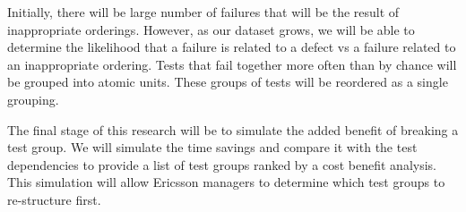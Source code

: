 Initially, there will be large number of failures that will be the result of inappropriate orderings. However, as our dataset grows, we will be able to determine the likelihood that a failure is related to a defect vs a failure related to an inappropriate ordering. Tests that fail together more often than by chance will be grouped into atomic units. These groups of tests will be reordered as a single grouping.

The final stage of this research will be to simulate the added benefit of breaking a test group. We will simulate the time savings and compare it with the test dependencies to provide a list of test groups ranked by a cost benefit analysis. This simulation will allow Ericsson managers to determine which test groups to re-structure first.



